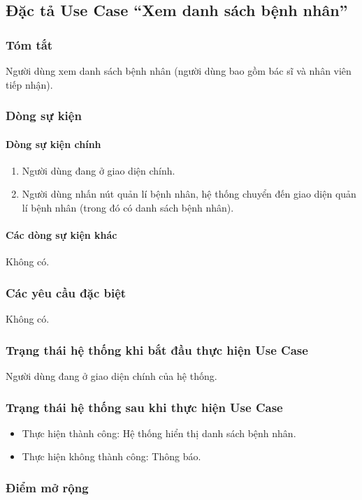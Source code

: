 \subsection{Đặc tả Use Case ``Xem danh sách bệnh nhân''}

\subsubsection{Tóm tắt}
Người dùng xem danh sách bệnh nhân (người dùng bao gồm bác sĩ và nhân viên tiếp nhận).

\subsubsection{Dòng sự kiện}
\paragraph{\textbf{Dòng sự kiện chính}}
\begin{enumerate}
  \item Người dùng đang ở giao diện chính.
  \item Người dùng nhấn nút quản lí bệnh nhân, hệ thống chuyển đến giao diện quản lí bệnh nhân (trong đó có danh sách bệnh nhân).
\end{enumerate}

\paragraph{\textbf{Các dòng sự kiện khác}}
Không có.

\subsubsection{Các yêu cầu đặc biệt}
Không có.

\subsubsection{Trạng thái hệ thống khi bắt đầu thực hiện Use Case}
Người dùng đang ở giao diện chính của hệ thống.

\subsubsection{Trạng thái hệ thống sau khi thực hiện Use Case}
\begin{itemize}
  \item Thực hiện thành công: Hệ thống hiển thị danh sách bệnh nhân.
  \item Thực hiện không thành công: Thông báo.
\end{itemize}

\subsubsection{Điểm mở rộng}